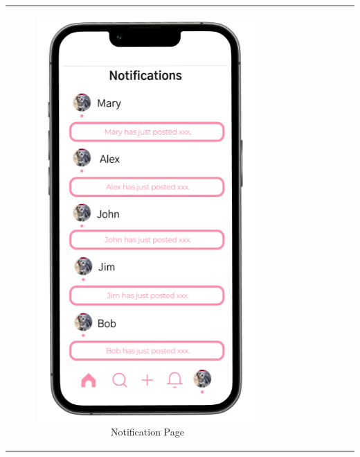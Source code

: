 \begin{longtable}{@{}cc@{}}
    \begin{subfigure}{.5\textwidth}
        \centering
        \includegraphics[width=.8\linewidth]{Figures/notification.png}
        \caption{\footnotesize Notification Page}
        \label{fig:notification}
    \end{subfigure}%
    &
    \begin{subfigure}{.5\textwidth}
        \centering

\end{subfigure}
\end{longtable}
